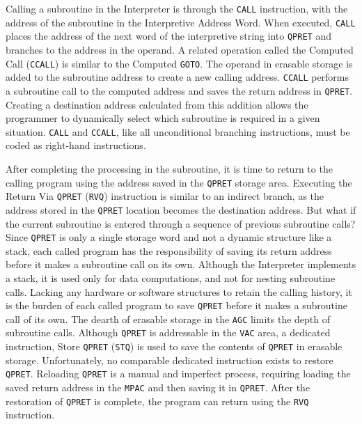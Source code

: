 \documentclass[refcap, oxford]{ahsan}
\begin{document}
Calling a subroutine in the Interpreter is through the \texttt{CALL} instruction, with the address of the subroutine in the Interpretive Address Word. When executed, \texttt{CALL} places the address of the next word of the interpretive string into \texttt{QPRET} and branches to the address in the operand. A related operation called the Computed Call (\texttt{CCALL}) is similar to the Computed \texttt{GOTO}. The operand in erasable storage is\\
added to the subroutine address to create a new calling address. \texttt{CCALL} performs a subroutine call to the computed address and saves the return address in \texttt{QPRET}. Creating a destination address calculated from this addition allows the programmer to dynamically select which subroutine is required in a given situation. \texttt{CALL} and \texttt{CCALL}, like all unconditional branching instructions, must be coded as right-hand instructions.

After completing the processing in the subroutine, it is time to return to the calling program using the address saved in the \texttt{QPRET} storage area. Executing the Return Via \texttt{QPRET} (\texttt{RVQ}) instruction is similar to an indirect branch, as the address stored in the \texttt{QPRET} location becomes the destination address. But what if the current subroutine is entered through a sequence of previous subroutine calls? Since \texttt{QPRET} is only a single storage word and not a dynamic structure like a stack, each called program has the responsibility of saving its return address before it makes a subroutine call on its own. Although the Interpreter implements a stack, it is used only for data computations, and not for nesting subroutine calls. Lacking any hardware or software structures to retain the calling history, it is the burden of each called program to save \texttt{QPRET} before it makes a subroutine call of its own. The dearth of erasable storage in the \texttt{AGC} limits the depth of subroutine calls. Although \texttt{QPRET} is addressable in the \texttt{VAC} area, a dedicated instruction, Store \texttt{QPRET} (\texttt{STQ}) is used to save the contents of \texttt{QPRET} in erasable storage. Unfortunately, no comparable dedicated instruction exists to restore \texttt{QPRET}. Reloading \texttt{QPRET} is a manual and imperfect process, requiring loading the saved return address in the \texttt{MPAC} and then saving it in \texttt{QPRET}. After the restoration of \texttt{QPRET} is complete, the program can return using the \texttt{RVQ} instruction.
\end{document}
